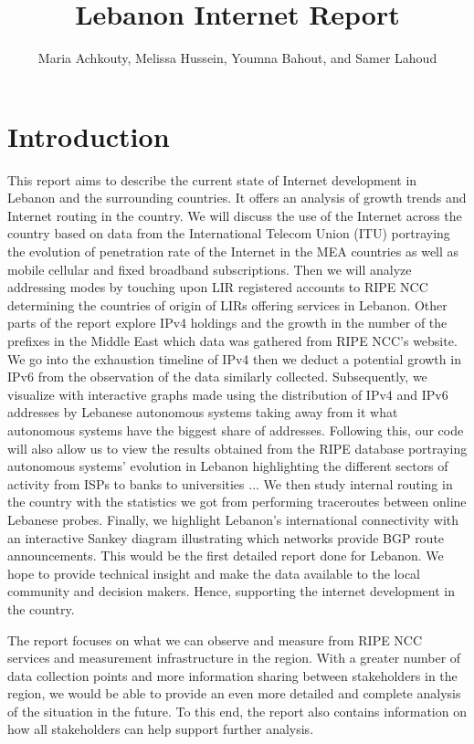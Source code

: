 \documentclass[a4paper,titlepage]{article}
\title{\color{astral}\Huge \bfseries Lebanon Internet Report}
\author{Maria Achkouty, Melissa Hussein, Youmna Bahout, and Samer Lahoud}
\begin{document}
\maketitle

\begin{abstract}

\end{abstract}

\section{Introduction}
This report aims to describe the current state of Internet development in Lebanon and the surrounding countries. It offers an analysis of growth trends and Internet routing in the country.
We will discuss the use of the Internet across the country based on data from the International Telecom Union (ITU) portraying the evolution of penetration rate of the Internet in the MEA countries as well as mobile cellular and fixed broadband subscriptions. Then we will analyze addressing modes by touching upon LIR registered accounts to RIPE NCC determining the countries of origin of LIRs offering services in Lebanon.
Other parts of the report explore IPv4 holdings and the growth in the number of the prefixes in the Middle East which data was gathered from RIPE NCC’s website. We go into the exhaustion timeline of IPv4 then we deduct a potential growth in IPv6 from the observation of the data similarly collected.
Subsequently, we visualize with interactive graphs made using the distribution of IPv4 and IPv6 addresses by Lebanese autonomous systems taking away from it what autonomous systems have the biggest share of addresses.
Following this, our code will also allow us to view the results obtained from the RIPE database portraying autonomous systems’ evolution in Lebanon highlighting the different sectors of activity from ISPs to banks to universities ...
We then study internal routing in the country with the statistics we got from performing traceroutes between online Lebanese probes.
Finally, we highlight Lebanon’s international connectivity with an interactive Sankey diagram illustrating which networks provide BGP route announcements.
This would be the first detailed report done for Lebanon. We hope to provide technical insight and make the data available to the local community and decision makers. Hence, supporting the internet development in the country.

The report focuses on what we can observe and measure from RIPE NCC services and measurement infrastructure in the region. With a greater number of data collection points and more information sharing between stakeholders in the region, we would be able to provide an even more detailed and complete analysis of the situation in the future. To this end, the report also contains information on how all stakeholders can help support further analysis.
\end{document}
